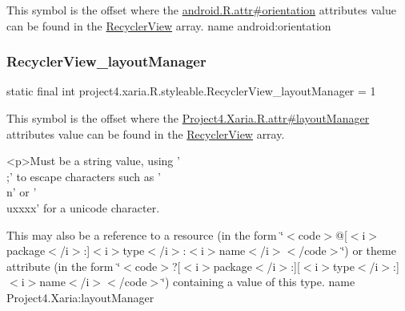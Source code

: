 This symbol is the offset where the \hyperlink{}{android.\+R.\+attr\#orientation} attribute\textquotesingle{}s value can be found in the \hyperlink{classproject4_1_1xaria_1_1R_1_1styleable_ad70c99b52204a6206f85345454bda20d}{Recycler\+View} array.  name android\+:orientation \mbox{\label{classproject4_1_1xaria_1_1R_1_1styleable_aa9cec08b1f2e28b73fb9eed845399b00}} 
\subsubsection{\texorpdfstring{Recycler\+View\+\_\+layout\+Manager}{RecyclerView\_layoutManager}}
{\footnotesize\ttfamily static final int project4.\+xaria.\+R.\+styleable.\+Recycler\+View\+\_\+layout\+Manager = 1\hspace{0.3cm}{\ttfamily [static]}}

This symbol is the offset where the \hyperlink{}{Project4.\+Xaria.\+R.\+attr\#layout\+Manager} attribute\textquotesingle{}s value can be found in the \hyperlink{classproject4_1_1xaria_1_1R_1_1styleable_ad70c99b52204a6206f85345454bda20d}{Recycler\+View} array.

\begin{DoxyVerb}      <p>Must be a string value, using '\\;' to escape characters such as '\\n' or '\\uxxxx' for a unicode character.
\end{DoxyVerb}
 

This may also be a reference to a resource (in the form \char`\"{}$<$code$>$@\mbox{[}$<$i$>$package$<$/i$>$\+:\mbox{]}$<$i$>$type$<$/i$>$\+:$<$i$>$name$<$/i$>$$<$/code$>$\char`\"{}) or theme attribute (in the form \char`\"{}$<$code$>$?\mbox{[}$<$i$>$package$<$/i$>$\+:\mbox{]}\mbox{[}$<$i$>$type$<$/i$>$\+:\mbox{]}$<$i$>$name$<$/i$>$$<$/code$>$\char`\"{}) containing a value of this type.  name Project4.\+Xaria\+:layout\+Manager \mbox{\label{classproject4_1_1xaria_1_1R_1_1styleable_a3ea954156e7ab808e833eaff0274d45f}} 
